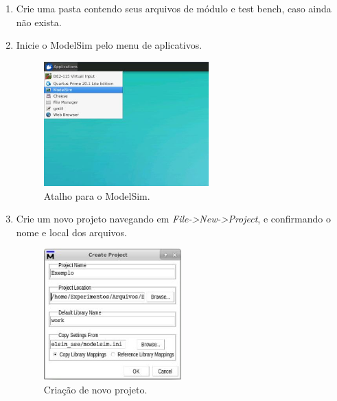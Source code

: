 \documentclass[12pt]{article}
\begin{document}
\begin{enumerate}[font=\bfseries]
    \item Crie uma pasta contendo seus arquivos de módulo e test bench, caso ainda não exista.

    \item Inicie o ModelSim pelo menu de aplicativos.
    \begin{figure}[H]
    \centering
    \includegraphics[width=0.6\textwidth]{img/modelsim_open.jpg}
    \caption{\label{ref:modelsim-open}Atalho para o ModelSim.}
    \end{figure}

    \pagebreak

    \item Crie um novo projeto navegando em \textit{File->New->Project}, e confirmando o nome e local dos arquivos.
    \begin{figure}[H]
    \centering
    \includegraphics[width=0.5\textwidth]{img/modelsim_project.jpg}
    \caption{\label{ref:modelsim-project}Criação de novo projeto.}
    \end{figure}


\end{enumerate}
\end{document}
